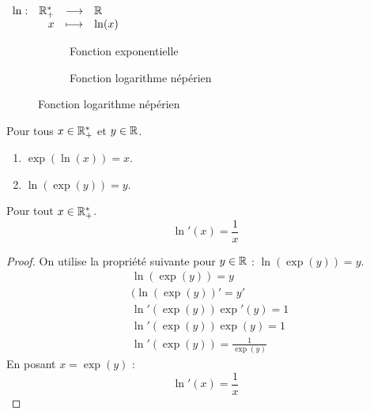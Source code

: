 \begin{definition}
	\begin{center}
		$
		\begin{array}{rrcl} \ln : & \mathbb{R}_+^* & \longrightarrow & \mathbb{R} \\ & x & \longmapsto & \ln(x) \end{array}
		$
	\end{center}
\end{definition}

\begin{figure}[!h]
	\centering
	\begin{subfigure}{0.45\textwidth}
		\caption{Fonction exponentielle}
	\end{subfigure}
	\begin{subfigure}{0.45\textwidth}
		\caption{Fonction logarithme népérien}
	\end{subfigure}
\end{figure}

\begin{proposition}
	Pour tous $x \in \mathbb{R}_+^*$ et $y \in \mathbb{R}$.
    \begin{multicols}{2}
        \begin{enumerate}
            \item $\exp(\ln(x)) = x$.
            \item $\ln(\exp(y)) = y$.
        \end{enumerate}
    \end{multicols}
\end{proposition}

\begin{proposition}
	Pour tout $x \in \mathbb{R}_+^*$.
	\[ \ln'(x) = \frac{1}{x} \]
\end{proposition}

\begin{proof}
	On utilise la propriété suivante pour $y \in \mathbb{R}$ : $\ln(\exp(y)) = y$.
	\begin{align*}
		&\ln(\exp(y)) = y \\
		&(\ln(\exp(y))' = y' \\
		&\ln'(\exp(y)) \exp'(y) = 1 \\
		&\ln'(\exp(y)) \exp(y) = 1 \\
		&\ln'(\exp(y)) = \frac{1}{\exp(y)}
	\end{align*}
	En posant $x = \exp(y)$ :
	\[ \ln'(x) = \frac{1}{x} \]
\end{proof}

